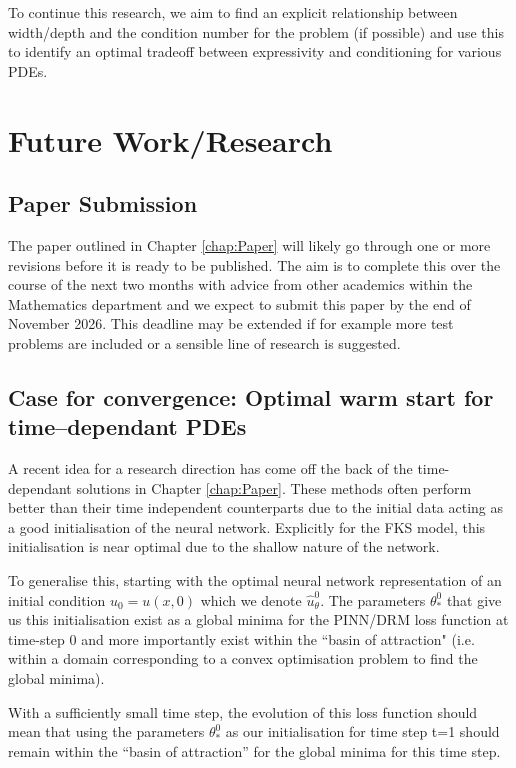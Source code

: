 \documentclass[11pt, onecolumn]{report}
\begin{document}
To continue this research, we aim to find an explicit relationship between width/depth and the condition number for the problem (if possible) and use this to identify an optimal tradeoff between expressivity and conditioning for various PDEs.

\chapter{Future Work/Research}
\label{chap:FutureResearch}
\section{Paper Submission}
The paper outlined in Chapter \ref{chap:Paper} will likely go through one or more revisions before it is ready to be published. The aim is to complete this over the course of the next two months with advice from other academics within the Mathematics department and we expect to submit this paper by the end of November 2026. This deadline may be extended if for example more test problems are included or a sensible line of research is suggested. 

\section{Case for convergence: Optimal warm start for time--dependant PDEs}
\label{sec:WarmStart}

A recent idea for a research direction has come off the back of the time-dependant solutions in Chapter \ref{chap:Paper}. These methods often perform better than their time independent counterparts due to the initial data acting as a good initialisation of the neural network. Explicitly for the FKS model, this initialisation is near optimal due to the shallow nature of the network. 

To generalise this, starting with the optimal neural network representation of an initial condition $u_0 = u(x,0)$ which we denote $\hat u_\theta^0$. The parameters $\theta_*^0$ that give us this initialisation exist as a global minima for the PINN/DRM loss function at time-step 0 and more importantly exist within the ``basin of attraction" (i.e. within a domain corresponding to a convex optimisation problem to find the global minima). 

With a sufficiently small time step, the evolution of this loss function should mean that using the parameters $\theta_*^0$ as our initialisation for time step t=1 should remain within the ``basin of attraction'' for the global minima for this time step.
\end{document}
